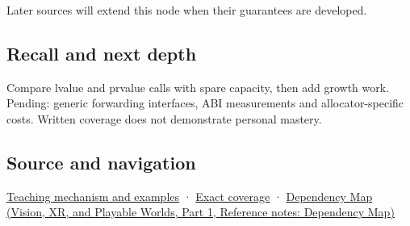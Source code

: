 \hypertarget{appendix-d5908f75721f-used-by}{}

Later sources will extend this node when their guarantees are developed.

\subsection{Recall and next depth}\label{appendix-d5908f75721f-recall-and-next-depth}

\hypertarget{appendix-d5908f75721f-recall-and-next-depth}{}

Compare lvalue and prvalue calls with spare capacity, then add growth work. Pending: generic forwarding interfaces, ABI measurements and allocator-specific costs. Written coverage does not demonstrate personal mastery.

\subsection{Source and navigation}\label{appendix-d5908f75721f-source-and-navigation}

\hypertarget{appendix-d5908f75721f-source-and-navigation}{}

\hyperref[01-foundations-i-ch003-a-value-crosses-the-function-boundary]{Teaching mechanism and examples} · \hyperref[appendix-fd090d982a15-m009---parts-127-147]{Exact coverage} · \href{../07-Vision-XR-and-Playable-Worlds-P01/main.pdf\#appendix-4ad47bdd269a}{Dependency Map (Vision, XR, and Playable Worlds, Part 1, Reference notes: Dependency Map)}
